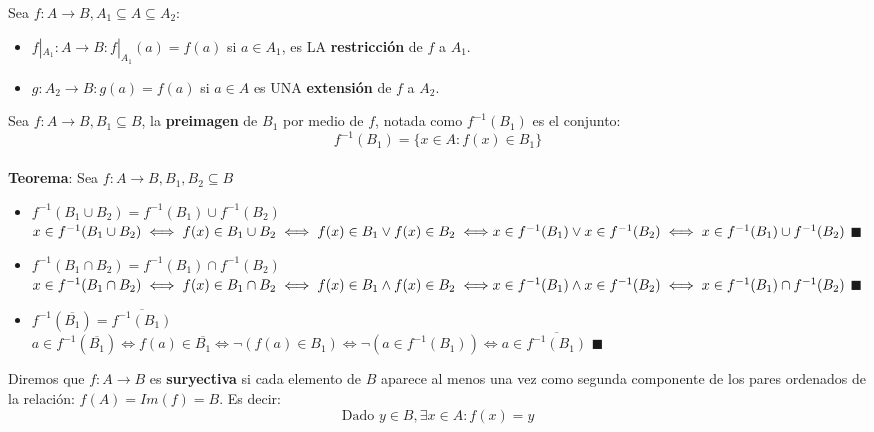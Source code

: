 \documentclass[11pt,a4paper]{article}
\newcommand*{\QEDA}{\null\nobreak\hfill\ensuremath{\blacksquare}}
\begin{document}
\noindent Sea $f:A\rightarrow B, A_1 \subseteq A \subseteq A_2$:
\begin{itemize}
\item $f|_{A_1} : A \rightarrow B : f|_{A_1}(a) = f(a)$ si $a \in A_1$, es LA \textbf{restricci\'on} de $f$ a $A_1$.
\item $g : A_2 \rightarrow B : g(a) = f(a)$ si $a \in A$ es UNA \textbf{extensi\'on} de $f$ a $A_2$.\\
\end{itemize}

\noindent Sea $f: A \rightarrow B, B_1 \subseteq B$, la \textbf{preimagen} de $B_1$ por medio de $f$, notada como $f^{-1}(B_1)$ es el conjunto:
$$f^{-1}(B_1) = \{ x \in A : f(x) \in B_1 \}$$\\

\newpage
\noindent \textbf{Teorema}: Sea $f: A \rightarrow B, B_1, B_2 \subseteq B$
\begin{itemize}
\item $f^{-1}(B_1 \cup B_2) = f^{-1}(B_1) \cup f^{-1}(B_2)$\\
$x \in f^{-1}(B_1 \cup B_2) \iff f(x) \in B_1 \cup B_2 \iff f(x) \in B_1 \lor f(x) \in B_2 \iff \\ x \in f^{-1}(B_1) \lor x \in f^{-1}(B_2) \iff x \in f^{-1}(B_1) \cup f^{-1}(B_2)$ \QEDA
\item $f^{-1}(B_1 \cap B_2) = f^{-1}(B_1) \cap f^{-1}(B_2)$\\
$x \in f^{-1}(B_1 \cap B_2) \iff f(x) \in B_1 \cap B_2 \iff f(x) \in B_1 \land f(x) \in B_2 \iff \\ x \in f^{-1}(B_1) \land x \in f^{-1}(B_2) \iff x \in f^{-1}(B_1) \cap f^{-1}(B_2)$ \QEDA
\item $f^{-1}(\overline{B_1}) = \overline{f^{-1}(B_1)}$\\
\indent $a\in f^{-1}(\overline{B_1}) \iff f(a)\in\overline{B_1} \iff \lnot(f(a)\in B_1) \iff \lnot(a\in f^{-1}(B_1)) \iff a \in \overline{f^{-1}(B_1)}$ \QEDA\\
\end{itemize}

\noindent Diremos que $f : A \rightarrow B$ es \textbf{suryectiva} si cada elemento de $B$ aparece al menos una vez como segunda componente de los pares ordenados de la relaci\'on: $f(A) = Im(f) = B$. Es decir:$$ \text{Dado } y \in B, \exists x \in A : f(x) = y $$
\end{document}
